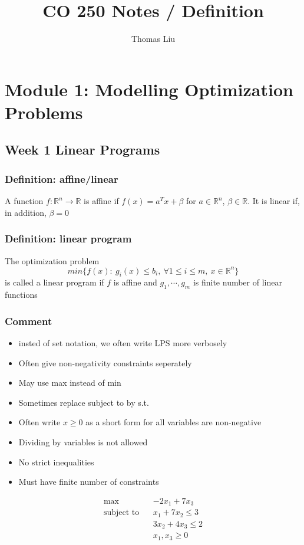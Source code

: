 \documentclass[11pt]{article}
\title{CO 250 Notes / Definition}
\author{Thomas Liu}
\newcommand{\R}{{\mathbb{R}}}
\begin{document}
\maketitle
\tableofcontents
\newpage

\section{Module 1: Modelling Optimization Problems}
\subsection{Week 1 Linear Programs}
\subsubsection{Definition: affine/linear}
A function $f: \R^n\rightarrow\R$ is affine if $f(x) = a^Tx+\beta$ for $a\in\R^n$, $\beta\in\R$. It is linear if, in addition, $\beta = 0$
\subsubsection{Definition: linear program}
The optimization problem \[min\{f(x):\ g_i(x)\leq b_i,\ \forall 1\leq i\leq m,\ x\in\R^n\}\]
is called a linear program if $f$ is affine and $g_1,\cdots, g_m$ is finite number of linear functions 
\subsubsection*{Comment}
\begin{itemize}
    \item insted of set notation, we often write LPS more verbosely
    \item Often give non-negativity constraints seperately
    \item May use max instead of min
    \item Sometimes replace subject to by s.t.
    \item Often write $x\geq 0$ as a short form for all variables are non-negative
    \item Dividing by variables is not allowed
    \item No strict inequalities 
    \item Must have finite number of constraints 
\end{itemize}
\begin{align*}
    \text{max}\ \ \ \ &-2x_1 + 7x_3 \\
    \text{subject to}\ \ \ \ &x_1+7x_2\leq 3 \\
    &3x_2+4x_3\leq 2 \\
    &x_1, x_3\geq 0
\end{align*}
\end{document}
